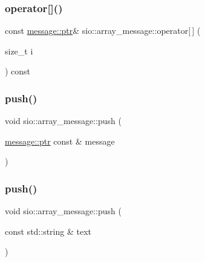 \mbox{\label{classsio_1_1array__message_a4643f17c6f0fca23cd8c2c1d359d362d}} 
\subsubsection{\texorpdfstring{operator[]()}{operator[]()}}
{\footnotesize\ttfamily const \hyperlink{classsio_1_1message_a6340b6fef57e4516eb17928b1885a615}{message\+::ptr}\& sio\+::array\+\_\+message\+::operator\mbox{[}$\,$\mbox{]} (\begin{DoxyParamCaption}\item[{size\+\_\+t}]{i }\end{DoxyParamCaption}) const\hspace{0.3cm}{\ttfamily [inline]}}

\mbox{\label{classsio_1_1array__message_a2bb6a7dc5a4bc481ec6638b027732e30}} 
\subsubsection{\texorpdfstring{push()}{push()}\hspace{0.1cm}{\footnotesize\ttfamily [1/5]}}
{\footnotesize\ttfamily void sio\+::array\+\_\+message\+::push (\begin{DoxyParamCaption}\item[{\hyperlink{classsio_1_1message_a6340b6fef57e4516eb17928b1885a615}{message\+::ptr} const \&}]{message }\end{DoxyParamCaption})\hspace{0.3cm}{\ttfamily [inline]}}

\mbox{\label{classsio_1_1array__message_aa64e942b4bcdd9484638666bb45b6a1c}} 
\subsubsection{\texorpdfstring{push()}{push()}\hspace{0.1cm}{\footnotesize\ttfamily [2/5]}}
{\footnotesize\ttfamily void sio\+::array\+\_\+message\+::push (\begin{DoxyParamCaption}\item[{const std\+::string \&}]{text }\end{DoxyParamCaption})\hspace{0.3cm}{\ttfamily [inline]}}

